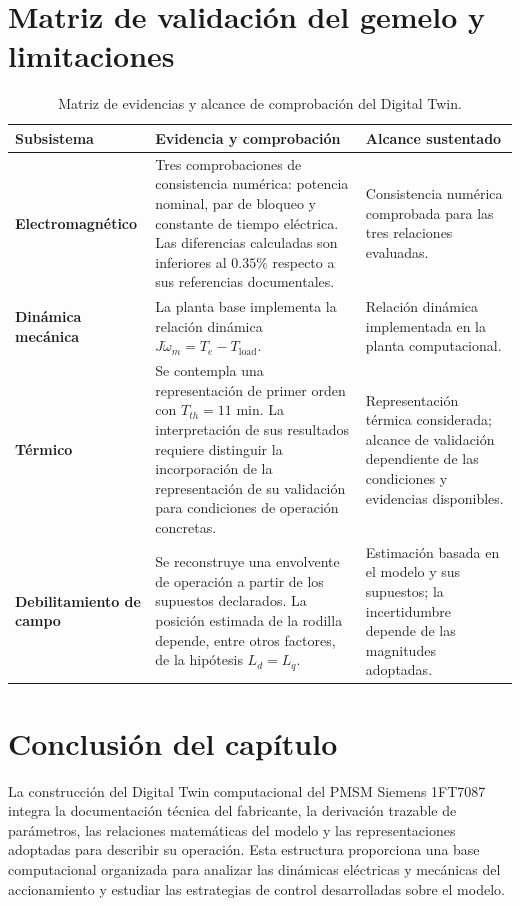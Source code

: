 \section{Matriz de validación del gemelo y limitaciones}


\begin{table}[H]
\centering
\caption{Matriz de evidencias y alcance de comprobación del Digital Twin.}
\label{tab:validacion_gemelo}
\begin{tabular}{p{3.1cm} p{6.1cm} p{3.8cm}}
\toprule
\textbf{Subsistema} & \textbf{Evidencia y comprobación} & \textbf{Alcance sustentado} \\
\midrule
\textbf{Electromagnético} &
Tres comprobaciones de consistencia numérica: potencia nominal, par de bloqueo y constante de tiempo eléctrica. Las diferencias calculadas son inferiores al $0.35\%$ respecto a sus referencias documentales. &
Consistencia numérica comprobada para las tres relaciones evaluadas. \\

\textbf{Dinámica mecánica} &
La planta base implementa la relación dinámica $J\dot{\omega}_m=T_e-T_{\mathrm{load}}$. &
Relación dinámica implementada en la planta computacional. \\

\textbf{Térmico} &
Se contempla una representación de primer orden con $T_{th}=11$ min. La interpretación de sus resultados requiere distinguir la incorporación de la representación de su validación para condiciones de operación concretas. &
Representación térmica considerada; alcance de validación dependiente de las condiciones y evidencias disponibles. \\

\textbf{Debilitamiento de campo} &
Se reconstruye una envolvente de operación a partir de los supuestos declarados. La posición estimada de la rodilla depende, entre otros factores, de la hipótesis $L_d=L_q$. &
Estimación basada en el modelo y sus supuestos; la incertidumbre depende de las magnitudes adoptadas. \\
\bottomrule
\end{tabular}
\end{table}

\section{Conclusión del capítulo}

La construcción del Digital Twin computacional del PMSM Siemens 1FT7087 integra la documentación técnica del fabricante, la derivación trazable de parámetros, las relaciones matemáticas del modelo y las representaciones adoptadas para describir su operación. Esta estructura proporciona una base computacional organizada para analizar las dinámicas eléctricas y mecánicas del accionamiento y estudiar las estrategias de control desarrolladas sobre el modelo.

